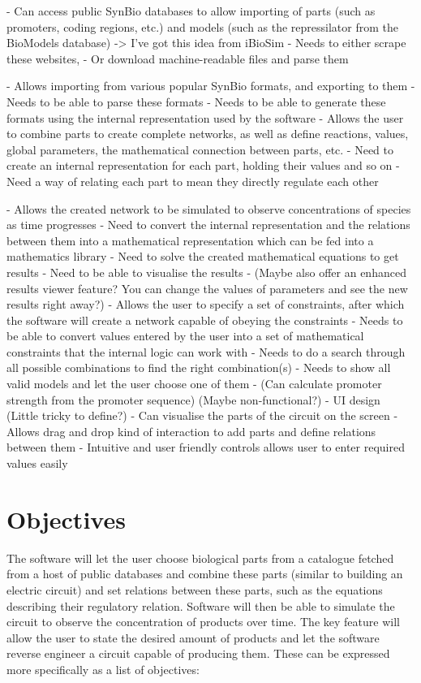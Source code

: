 \documentclass{article}
\begin{document}
	- Can access public SynBio databases to allow importing of parts (such as promoters, coding regions, etc.) and models (such as the repressilator from the BioModels database) -> I've got this idea from iBioSim
	- Needs to either scrape these websites,
	- Or download machine-readable files and parse them
	
	- Allows importing from various popular SynBio formats, and exporting to them
	- Needs to be able to parse these formats
	- Needs to be able to generate these formats using the internal representation used by the software
	- Allows the user to combine parts to create complete networks, as well as define reactions, values, global parameters, the mathematical connection between parts, etc.
	- Need to create an internal representation for each part, holding their values and so on
	- Need a way of relating each part to mean they directly regulate each other
	
	- Allows the created network to be simulated to observe concentrations of species as time progresses
	- Need to convert the internal representation and the relations between them into a mathematical representation which can be fed into a mathematics library
	- Need to solve the created mathematical equations to get results
	- Need to be able to visualise the results
	- (Maybe also offer an enhanced results viewer feature? You can change the values of parameters and see the new results right away?)
	- Allows the user to specify a set of constraints, after which the software will create a network capable of obeying the constraints
	- Needs to be able to convert values entered by the user into a set of mathematical constraints that the internal logic can work with
	- Needs to do a search through all possible combinations to find the right combination(s)
	- Needs to show all valid models and let the user choose one of them
	- (Can calculate promoter strength from the promoter sequence)
	(Maybe non-functional?)
	- UI design (Little tricky to define?)
	- Can visualise the parts of the circuit on the screen
	- Allows drag and drop kind of interaction to add parts and define relations between them
	- Intuitive and user friendly controls allows user to enter required values easily
	
	\section{Objectives}
		\par The software will let the user choose biological parts from a catalogue fetched from a host of public databases and combine these parts (similar to building an electric circuit) and set relations between these parts, such as the equations describing their regulatory relation. Software will then be able to simulate the circuit to observe the concentration of products over time. The key feature will allow the user to state the desired amount of products and let the software reverse engineer a circuit capable of producing them. These can be expressed more specifically as a list of objectives:
		
\end{document}
